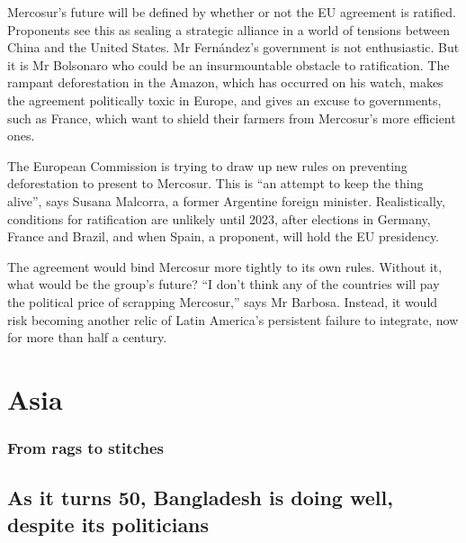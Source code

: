 \documentclass{article}
\begin{document}
Mercosur's future will be defined by whether or not the EU agreement is ratified. Proponents see this as sealing a strategic alliance in a world of tensions between China and the United States. Mr Fernández's government is not enthusiastic. But it is Mr Bolsonaro who could be an insurmountable obstacle to ratification. The rampant deforestation in the Amazon, which has occurred on his watch, makes the agreement politically toxic in Europe, and gives an excuse to governments, such as France, which want to shield their farmers from Mercosur's more efficient ones. 

The European Commission is trying to draw up new rules on preventing deforestation to present to Mercosur. This is ``an attempt to keep the thing alive'', says Susana Malcorra, a former Argentine foreign minister. Realistically, conditions for ratification are unlikely until 2023, after elections in Germany, France and Brazil, and when Spain, a proponent, will hold the EU presidency. 

The agreement would bind Mercosur more tightly to its own rules. Without it, what would be the group's future? ``I don't think any of the countries will pay the political price of scrapping Mercosur,'' says Mr Barbosa. Instead, it would risk becoming another relic of Latin America's persistent failure to integrate, now for more than half a century. 
\clearpage
\section{Asia }
\subsubsection{From rags to stitches }
\subsection{As it turns 50, Bangladesh is doing well, despite its politicians }
\end{document}
